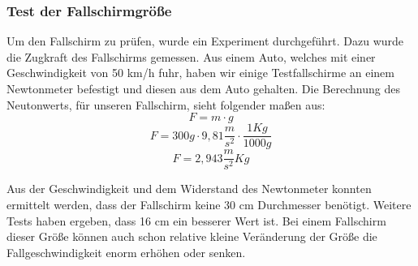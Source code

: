 \subsubsection{Test der Fallschirmgröße}
Um den Fallschirm zu prüfen, wurde ein Experiment durchgeführt. Dazu wurde die Zugkraft des Fallschirms gemessen. Aus einem Auto, welches mit einer Geschwindigkeit von 50 km/h fuhr, haben wir einige Testfallschirme an einem Newtonmeter befestigt und diesen aus dem Auto gehalten. Die Berechnung des Neutonwerts, für unseren Fallschirm, sieht folgender maßen aus:
\[
F = m \cdot g
\]
\[
F = 300g \cdot 9,81\frac{m}{s^2} \cdot \frac{1Kg}{1000g}
\]
\[
F = 2,943 \frac{m}{s^2} Kg
\]

 Aus der Geschwindigkeit und dem Widerstand des Newtonmeter konnten ermittelt werden, dass der Fallschirm keine 30 cm Durchmesser benötigt. Weitere Tests haben ergeben, dass 16 cm ein besserer Wert ist. Bei einem Fallschirm dieser Größe können auch schon relative kleine Veränderung der Größe die Fallgeschwindigkeit enorm erhöhen oder senken.
